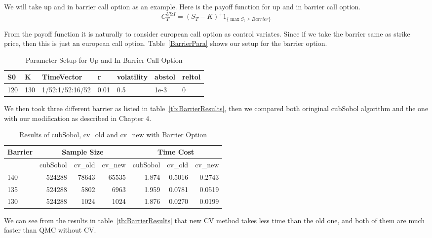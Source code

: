 \iffalse
\begin{figure}[h]
    \centering
    \caption{Walsh coefficients of $f$}
    \texttt{[image: figures/cvEx1.eps]}
\end{figure}
\fi


We will take up and in barrier call option as an example. Here is the payoff function for up and in barrier call option.
\[ C_{T}^{U\&I} = (S_T-K)^+1_{ \{\max S_t \geq Barrier\}} \]

From the payoff function it is naturally to consider european call option as control variates. Since if we take the barrier same as strike price, then this is just an european call option. Table~\ref{BarrierPara} shows our setup for the barrier option.
\begin{table}[h]
    \caption{Parameter Setup for Up and In Barrier Call Option}
    \centering
	\begin{tabular}{lllllll}
        \hline\hline
        S0 & K & TimeVector & r & volatility & abstol & reltol \\[0.5ex]
        \hline
        120  & 130 & 1/52:1/52:16/52 & 0.01 & 0.5 & 1e-3 & 0\\[1ex]
        \hline
	\end{tabular}
\label{tb:BarrierPara}
\end{table}

We then took three different barrier as listed in table~\ref{tb:BarrierResults}, then we compared both oringinal cubSobol algorithm and the one with our modification as described in Chapter 4. 
\begin{table}[h]
    \centering
    \begin{tabular}{lrrrrrr}
    \hline\hline
	Barrier &\multicolumn{3}{c}{Sample Size}
		&\multicolumn{3}{c}{Time Cost} \\
    \hline
	&cubSobol&cv\_old&cv\_new
    &cubSobol&cv\_old&cv\_new\\[0.5ex]
    \hline
	140  & 524288&78643& 65535
	     & 1.874& 0.5016&0.2743 \\ 
	135  & 524288& 5802&6963
	     & 1.959& 0.0781&0.0519 \\ 
	130  & 524288& 1024&1024
    & 1.876& 0.0270 & 0.0199 \\[1ex]
    \hline
	\end{tabular}
	\caption{Results of cubSobol, cv\_old and cv\_new with Barrier Option}
\end{table}
We can see from the results in table~\ref{tb:BarrierResults} that new CV method takes less time than the old one, and both of them are much faster than QMC without CV.

